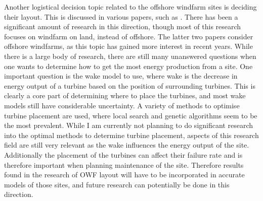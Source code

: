 \documentclass[a4paper,12pt]{article}
\begin{document}
\bigskip

Another logistical decision topic related to the offshore windfarm sites is deciding their layout. This is discussed in various papers, such as \cite{mosetti1994optimization,kusiak2010design,saavedra2011seeding,perez2013offshore,hou2017combined}. There has been a significant amount of research in this direction, though most of this research focuses on windfarm on land, instead of offshore. The latter two papers \cite{perez2013offshore,hou2017combined} consider offshore windfarms, as this topic has gained more interest in recent years. While there is a large body of research, there are still many unanswered questions when one wants to determine how to get the most energy production from a site. One important question is the wake model to use, where wake is the decrease in energy output of a turbine based on the position of surrounding turbines. This is clearly a core part of determining where to place the turbines, and most wake models still have considerable uncertainty. A variety of methods to optimise turbine placement are used, where local search and genetic algorithms seem to be the most prevalent. While I am currently not planning to do significant research into the optimal methods to determine turbine placement, aspects of this research field are still very relevant as the wake influences the energy output of the site. Additionally the placement of the turbines can affect their failure rate and is therefore important when planning maintenance of the site. Therefore results found in the research of OWF layout will have to be incorporated in accurate models of those sites, and future research can potentially be done in this direction.
\end{document}
